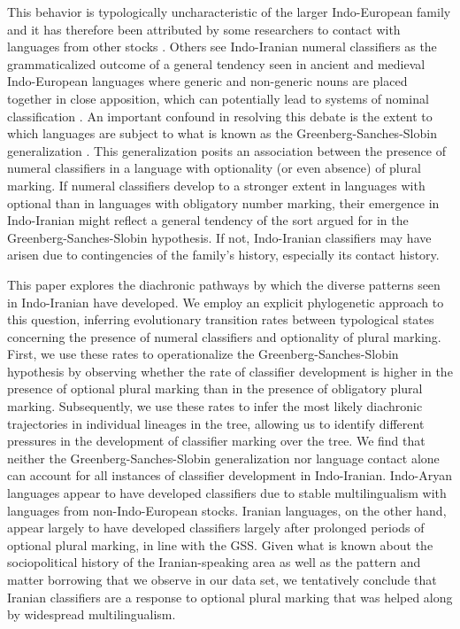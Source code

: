 \documentclass[11pt]{article}
\begin{document}
This behavior is typologically uncharacteristic of the larger Indo-European family and it has therefore been attributed by some researchers to contact with languages from other stocks \citep{Emeneau1956,Emeneau1965,Matisoff1978,ThomasonKaufman1988}.
Others see Indo-Iranian numeral classifiers as the grammaticalized outcome of a general tendency seen in ancient and medieval Indo-European languages where generic and non-generic nouns are placed together in close apposition, which can potentially lead to systems of nominal classification \citep{Hackstein2010}. An important confound in resolving this debate is the extent to which languages are subject to what is known as the Greenberg-Sanches-Slobin generalization \citep{Greenberg1972,SanchesSlobin1973}. This generalization posits an association between the presence of numeral classifiers in a language with optionality (or even absence) of plural marking. If numeral classifiers develop to a stronger extent in languages with optional than in languages with obligatory number marking, their emergence in Indo-Iranian might reflect a general tendency of the sort argued for in the Greenberg-Sanches-Slobin hypothesis. If not, Indo-Iranian classifiers may have arisen due to contingencies of the family's history, especially its contact history.

This paper explores the diachronic pathways by which the diverse patterns seen in Indo-Iranian have developed. 
We employ an explicit phylogenetic approach to this question, inferring evolutionary transition rates between typological states concerning the presence of numeral classifiers and optionality of plural marking. 
First, we use these rates to operationalize the Greenberg-Sanches-Slobin hypothesis by observing whether the rate of classifier development is higher in the presence of optional plural marking than in the presence of obligatory plural marking. 
Subsequently, we use these rates to infer the most likely diachronic trajectories in individual lineages in the tree, allowing us to identify different pressures in the development of classifier marking over the tree. 
We find that neither the Greenberg-Sanches-Slobin generalization nor language contact alone can account for all instances of classifier development in Indo-Iranian. 
Indo-Aryan languages appear to have developed classifiers due to stable multilingualism with languages from non-Indo-European stocks. 
Iranian languages, on the other hand, appear largely to have developed classifiers largely after prolonged periods of optional plural marking, in line with the GSS. Given what is known about the sociopolitical history of the Iranian-speaking area as well as the pattern and matter borrowing  \citep{MatrasSakel2007} that we observe in our data set, we tentatively conclude that Iranian classifiers are a response to optional plural marking that was helped along by widespread multilingualism. 
\end{document}
